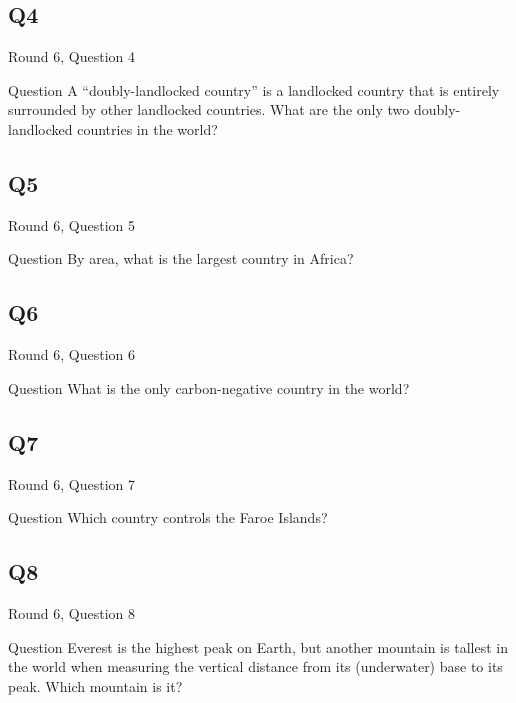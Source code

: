 \documentclass[11pt]{beamer}
\begin{document}
\subsection*{Q4}
\begin{frame}[t]{Round 6, Question 4}
\begin{block}{Question}
A ``doubly-landlocked country'' is a landlocked country that is entirely surrounded by other landlocked countries. What are the only two doubly-landlocked countries in the world?
\end{block}
\end{frame}
\subsection*{Q5}
\begin{frame}[t]{Round 6, Question 5}
\begin{block}{Question}
By area, what is the largest country in Africa?
\end{block}
\end{frame}
\subsection*{Q6}
\begin{frame}[t]{Round 6, Question 6}
\begin{block}{Question}
What is the only carbon-negative country in the world?
\end{block}
\end{frame}
\subsection*{Q7}
\begin{frame}[t]{Round 6, Question 7}
\begin{block}{Question}
Which country controls the Faroe Islands?
\end{block}
\end{frame}
\subsection*{Q8}
\begin{frame}[t]{Round 6, Question 8}
\begin{block}{Question}
Everest is the highest peak on Earth, but another mountain is tallest in the world when measuring the vertical distance from its (underwater) base to its peak. Which mountain is it?
\end{block}
\end{frame}
\end{document}
